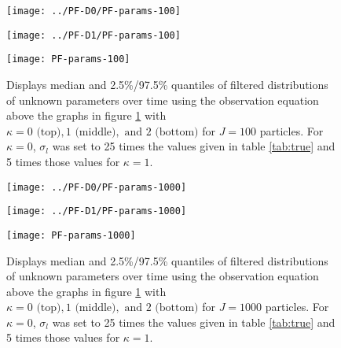 \documentclass{article}
\begin{document}
\begin{figure}[ht]
\caption*{$y_{l,t} \sim N(\log(b_li^{\varsigma_l}),\frac{\sigma_l^2}{(b_li^{\varsigma_l})^\kappa})$}
\begin{minipage}{1.1\linewidth}
\texttt{[image: ../PF-D0/PF-params-100]}
\end{minipage}
\begin{minipage}{1.1\linewidth}
\texttt{[image: ../PF-D1/PF-params-100]}
\end{minipage}
\begin{minipage}{1.1\linewidth}
\texttt{[image: PF-params-100]}
\end{minipage}
\caption{Displays median and 2.5\%/97.5\% quantiles of filtered distributions of unknown parameters over time using the observation equation above the graphs in figure \ref{fig:kappa} with $\kappa = 0 \mbox{ (top)}, 1 \mbox{ (middle)}, \mbox{ and } 2 \mbox{ (bottom)}$ for $J = 100$ particles. For $\kappa = 0$, $\sigma_l$ was set to 25 times the values given in table \ref{tab:true} and 5 times those values for $\kappa = 1$.} \label{fig:kappa}
\end{figure}

\begin{figure}[ht]
\begin{minipage}{1.1\linewidth}
\texttt{[image: ../PF-D0/PF-params-1000]}
\end{minipage}
\begin{minipage}{1.1\linewidth}
\texttt{[image: ../PF-D1/PF-params-1000]}
\end{minipage}
\begin{minipage}{1.1\linewidth}
\texttt{[image: PF-params-1000]}
\end{minipage}
\caption{Displays median and 2.5\%/97.5\% quantiles of filtered distributions of unknown parameters over time using the observation equation above the graphs in figure \ref{fig:kappa} with $\kappa = 0 \mbox{ (top)}, 1 \mbox{ (middle)}, \mbox{ and } 2 \mbox{ (bottom)}$ for $J = 1000$ particles. For $\kappa = 0$, $\sigma_l$ was set to 25 times the values given in table \ref{tab:true} and 5 times those values for $\kappa = 1$.}
\end{figure}
\end{document}
